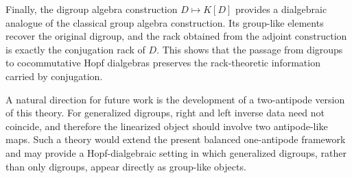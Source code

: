 \documentclass[11pt]{article}
\theoremstyle{plain}
\theoremstyle{definition}
\theoremstyle{remark}
\begin{document}
	Finally, the digroup algebra construction \(D\mapsto K[D]\) provides a
	dialgebraic analogue of the classical group algebra construction. Its
	group-like elements recover the original digroup, and the rack obtained from
	the adjoint construction is exactly the conjugation rack of \(D\). This shows
	that the passage from digroups to cocommutative Hopf dialgebras preserves the
	rack-theoretic information carried by conjugation.
	
	A natural direction for future work is the development of a two-antipode
	version of this theory. For generalized digroups, right and left inverse data
	need not coincide, and therefore the linearized object should involve two
	antipode-like maps. Such a theory would extend the present balanced
	one-antipode framework and may provide a Hopf-dialgebraic setting in which
	generalized digroups, rather than only digroups, appear directly as group-like
	objects.
	
\end{document}
